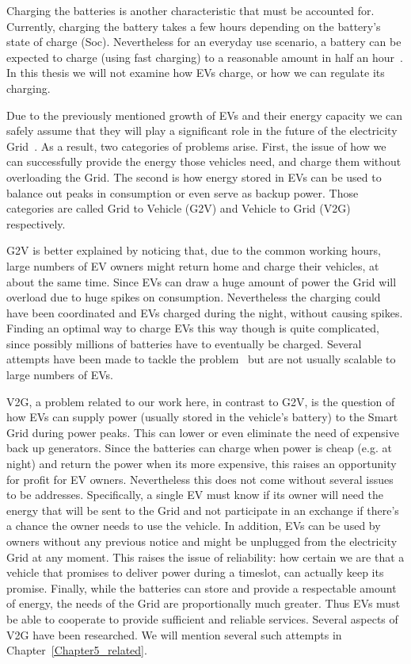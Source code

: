 Charging the batteries is another characteristic that must be accounted for. Currently, charging the battery takes a few hours depending on the battery's state of charge (Soc). Nevertheless for an everyday use scenario, a battery can be expected to charge (using fast charging) to a reasonable amount in half an hour~\cite{young2013electric}. In this thesis we will not examine how EVs charge, or how we can regulate its charging.

Due to the previously mentioned growth of EVs and their energy capacity we can safely assume that they will play a significant role in the future of the electricity Grid~\cite{ramchurn2012putting}. As a result, two categories of problems arise. First, the issue of how we can successfully provide the energy those vehicles need, and charge them without overloading the Grid. The second is how energy stored in EVs can be used to balance out peaks in consumption or even serve as backup power. Those categories are called Grid to Vehicle (G2V) and Vehicle to Grid (V2G)~\cite{loisel2014large}~\cite{kempton2005vehicle} respectively.

G2V is better explained by noticing that, due to the common working hours, large numbers of EV owners might return home and charge their vehicles, at about the same time. Since EVs can draw a huge amount of power the Grid will overload due to huge spikes on consumption. Nevertheless the charging could have been coordinated and EVs charged during the night, without causing spikes. Finding an optimal way to charge EVs this way though is quite complicated, since possibly millions of batteries have to eventually be charged. Several attempts have been made to tackle the problem~\cite{gan2013optimal}\cite{valogianni2014effective} but are not usually scalable to large numbers of EVs.

V2G, a problem related to our work here, in contrast to G2V, is the question of how EVs can supply power (usually stored in the vehicle's battery) to the Smart Grid during power peaks. This can lower or even eliminate the need of expensive back up generators. Since the batteries can charge when power is cheap (e.g. at night) and return the power when its more expensive, this raises an opportunity for profit for EV owners. Nevertheless this does not come without several issues to be addresses. Specifically, a single EV must know if its owner will need the energy that will be sent to the Grid and not participate in an exchange if there's a chance the owner needs to use the vehicle. In addition, EVs can be used by owners without any previous notice and might be unplugged from the electricity Grid at any moment. This raises the issue of reliability: how certain we are that a vehicle that promises to deliver power during a timeslot, can actually keep its promise. Finally, while the batteries can store and provide a respectable amount of energy, the needs of the Grid are proportionally much greater. Thus EVs must be able to cooperate to provide sufficient and reliable services. Several aspects of V2G have been researched. We will mention several such attempts in Chapter~\ref{Chapter5_related}.


